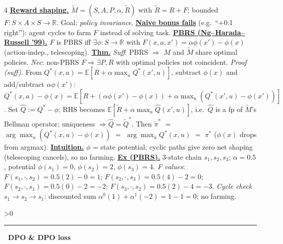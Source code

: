 \documentclass[10pt,landscape,letterpaper]{article}
\let\oldtextbf\textbf
\renewcommand{\textbf}[1]{\uline{\oldtextbf{#1}}}
\renewcommand{\section}[1]{%
  \ifnum\value{section}>0\par\vspace{1pt}\hrule\vspace{1pt}\fi
  \refstepcounter{section}\oldtextbf{\thesection\ #1}\ }
\begin{document}
\begin{multicols*}{4}
\textbf{Reward shaping.} \(\tilde M=(S,A,P,\alpha,\tilde R)\) with \(\tilde R=R+F\); bounded \(F:S{\times}A{\times}S\to\mathbb R\). Goal: \emph{policy invariance}.
\textbf{Naive bonus fails} (e.g.\ ``+0.1 right''): agent cycles to farm \(F\) instead of solving task.
\textbf{PBRS (Ng–Harada–Russell '99).} \(F\) is PBRS iff \(\exists\phi:S\to\mathbb R\) with \(F(x,a,x')=\alpha\phi(x')-\phi(x)\) (action-indep., telescoping).
\textbf{Thm.} \emph{Suff}: PBRS \(\Rightarrow\) \(M\) and \(\tilde M\) share optimal policies. \emph{Nec}: non-PBRS \(F\Rightarrow\exists P,R\) with optimal policies not coincident.
\emph{Proof (suff).} From \(Q^*(x,a){=}\mathbb E[R{+}\alpha\max_u Q^*(x',u)]\), subtract \(\phi(x)\) and add/subtract \(\alpha\phi(x')\): \(Q^*(x,a){-}\phi(x)=\mathbb E[R+(\alpha\phi(x'){-}\phi(x))+\alpha\max_u(Q^*(x',u){-}\phi(x'))]\). Set \(\hat Q:=Q^*{-}\phi\); RHS becomes \(\mathbb E[\tilde R+\alpha\max_u\hat Q(x',u)]\), i.e.\ \(\hat Q\) is a fp of \(\tilde M\)'s Bellman operator; uniqueness \(\Rightarrow\hat Q=\tilde Q^*\). Then \(\tilde\pi^*\) \(=\) \(\arg\max_u(Q^*(x,u){-}\phi(x))\) \(=\) \(\arg\max_u Q^*(x,u)\) \(=\) \(\pi^*\) (\(\phi(x)\) drops from argmax).
\textbf{Intuition.} \(\phi\) = state potential; cyclic paths give zero net shaping (telescoping cancels), so no farming.
\textbf{Ex (PBRS).} 3-state chain \(s_1,s_2,s_3\); \(\alpha{=}0.5\), potential \(\phi(s_1){=}0,\,\phi(s_2){=}2,\,\phi(s_3){=}4\).
\emph{F values}: \(F(s_1,\cdot,s_2){=}0.5(2){-}0{=}1\); \(F(s_2,\cdot,s_3){=}0.5(4){-}2{=}0\);
\(F(s_2,\cdot,s_1){=}0.5(0){-}2{=}{-}2\); \(F(s_3,\cdot,s_2){=}0.5(2){-}4{=}{-}3\).
\emph{Cycle check} \(s_1{\to}s_2{\to}s_1\): discounted sum \(\alpha^0(1)+\alpha^1({-}2)=1{-}1=0\); no farming.

\section{DPO \& DPO loss}


\end{multicols*}
\end{document}
